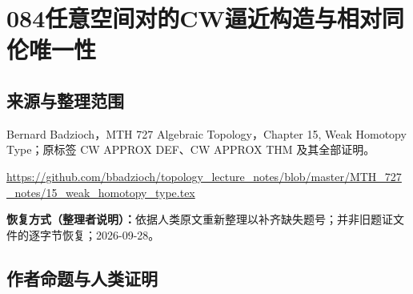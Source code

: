 \documentclass[UTF8,11pt]{ctexart}
\theoremstyle{definition}
\begin{document}
\section*{084\quad 任意空间对的CW逼近构造与相对同伦唯一性}
\subsection*{来源与整理范围}
Bernard Badzioch，MTH 727 Algebraic Topology，Chapter 15, Weak Homotopy Type；原标签 CW APPROX DEF、CW APPROX THM 及其全部证明。
\par\url{https://github.com/bbadzioch/topology_lecture_notes/blob/master/MTH_727_notes/15_weak_homotopy_type.tex}
\par\textbf{恢复方式（整理者说明）：}依据人类原文重新整理以补齐缺失题号；并非旧题证文件的逐字节恢复；2026-09-28。
\subsection*{作者命题与人类证明}
\end{document}
